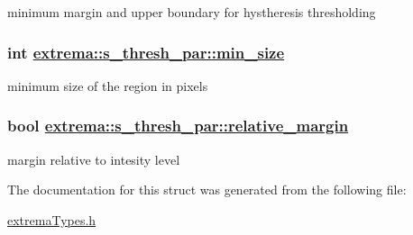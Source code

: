 minimum margin and upper boundary for hystheresis thresholding 

\hypertarget{structextrema_1_1s__thresh__par_ed4104cc58a20cce342903e9296ffef5}{
\subsubsection[min\_\-size]{\setlength{\rightskip}{0pt plus 5cm}int \hyperlink{structextrema_1_1s__thresh__par_ed4104cc58a20cce342903e9296ffef5}{extrema::s\_\-thresh\_\-par::min\_\-size}}}
\label{structextrema_1_1s__thresh__par_ed4104cc58a20cce342903e9296ffef5}


minimum size of the region in pixels 

\hypertarget{structextrema_1_1s__thresh__par_b341ebb6309f1e7423f5234c18d669b4}{
\subsubsection[relative\_\-margin]{\setlength{\rightskip}{0pt plus 5cm}bool \hyperlink{structextrema_1_1s__thresh__par_b341ebb6309f1e7423f5234c18d669b4}{extrema::s\_\-thresh\_\-par::relative\_\-margin}}}
\label{structextrema_1_1s__thresh__par_b341ebb6309f1e7423f5234c18d669b4}


margin relative to intesity level 



The documentation for this struct was generated from the following file:\begin{CompactItemize}
\item 
\hyperlink{extremaTypes_8h}{extrema\-Types.h}\end{CompactItemize}
